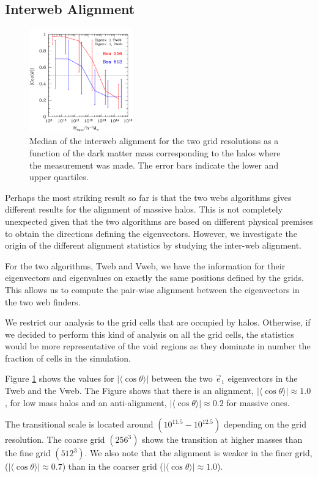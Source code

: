 \documentclass[useAMS,usenatbib]{mn2e}
\newcommand{\hMsun}{{\ifmmode{h^{-1}{\rm
        {M_{\odot}}}}\else{$h^{-1}{\rm{M_{\odot}}}$~}\fi}}
\newcommand{\muavg}{\vert\langle\cos\theta\rangle\vert}
\begin{document}
\subsection{Interweb Alignment}

\begin{figure}
\includegraphics[width=0.40\textwidth]{Fig5.pdf}
\caption{Median of the interweb alignment for the two grid
  resolutions as a function of the dark matter mass corresponding to
  the halos where the measurement was made. The error bars indicate
  the lower and upper quartiles.
\label{fig:interweb}}
\end{figure}

Perhaps the most striking result so far is that the two webs algorithms gives
different results for the alignment of massive halos. This is not
completely unexpected given that the two algorithms are based on
different physical premises to obtain the directions defining the
eigenvectors. However, we investigate the origin of the different
alignment statistics by studying the inter-web alignment.
 
For the two algorithms, Tweb and Vweb, we have the information for their
eigenvectors and eigenvalues on exactly the same positions defined
by the grids. This allows us to compute the pair-wise alignment
between the eigenvectors in the two web finders.

We restrict our analysis to the grid cells that are occupied by
halos. Otherwise, if we decided to perform this kind of analysis on
all the grid cells, the statistics would be more representative of the void
regions as they dominate in number the fraction of cells in the
simulation.

Figure \ref{fig:interweb} shows the values for $\muavg$ between the
two $\vec{e}_1$ eigenvectors in the Tweb and the Vweb.  The Figure
shows that there is an alignment, $\muavg\approx 1.0$, for low mass
halos and an anti-alignment, $\muavg\approx 0.2$ for massive ones.

The transitional scale is located around $(10^{11.5}-10^{12.5})$\hMsun
depending on the grid resolution. The coarse grid $(256^3)$ shows the
transition at higher masses than the fine grid $(512^3)$.   We also
note that the alignment is weaker in the finer grid, ($\muavg\approx
0.7$) than in the coarser grid ($\muavg\approx1.0$).
\end{document}
